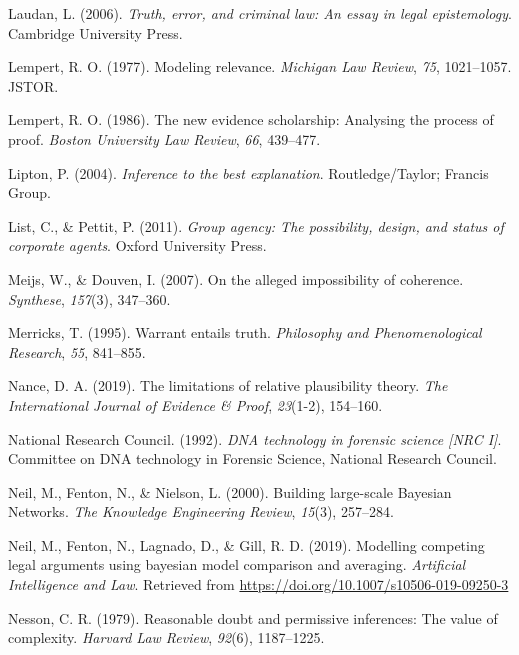\documentclass[11pt,dvipsnames,enabledeprecatedfontcommands]{scrartcl}
\begin{document}
\hypertarget{ref-laudan2006truth}{}
Laudan, L. (2006). \emph{Truth, error, and criminal law: An essay in
legal epistemology}. Cambridge University Press.

\hypertarget{ref-lempert1977modeling}{}
Lempert, R. O. (1977). Modeling relevance. \emph{Michigan Law Review},
\emph{75}, 1021--1057. JSTOR.

\hypertarget{ref-Lempert1986}{}
Lempert, R. O. (1986). The new evidence scholarship: Analysing the
process of proof. \emph{Boston University Law Review}, \emph{66},
439--477.

\hypertarget{ref-Lipton2004-LIPITT}{}
Lipton, P. (2004). \emph{Inference to the best explanation}.
Routledge/Taylor; Francis Group.

\hypertarget{ref-List2011Group}{}
List, C., \& Pettit, P. (2011). \emph{Group agency: The possibility,
design, and status of corporate agents}. Oxford University Press.

\hypertarget{ref-meijs2007}{}
Meijs, W., \& Douven, I. (2007). On the alleged impossibility of
coherence. \emph{Synthese}, \emph{157}(3), 347--360.

\hypertarget{ref-Merricks1995}{}
Merricks, T. (1995). Warrant entails truth. \emph{Philosophy and
Phenomenological Research}, \emph{55}, 841--855.

\hypertarget{ref-nance2019LimitationsRelativePlausibility}{}
Nance, D. A. (2019). The limitations of relative plausibility theory.
\emph{The International Journal of Evidence \& Proof}, \emph{23}(1-2),
154--160.

\hypertarget{ref-NRCI1992}{}
National Research Council. (1992). \emph{DNA technology in forensic
science \textup{{[}NRC I{]}}}. Committee on DNA technology in Forensic
Science, National Research Council.

\hypertarget{ref-neil2000BuildingLargescaleBayesian}{}
Neil, M., Fenton, N., \& Nielson, L. (2000). Building large-scale
Bayesian Networks. \emph{The Knowledge Engineering Review},
\emph{15}(3), 257--284.

\hypertarget{ref-Fenton2019Modelling}{}
Neil, M., Fenton, N., Lagnado, D., \& Gill, R. D. (2019). Modelling
competing legal arguments using bayesian model comparison and averaging.
\emph{Artificial Intelligence and Law}. Retrieved from
\url{https://doi.org/10.1007/s10506-019-09250-3}

\hypertarget{ref-Nesson1979Reasonable-doub}{}
Nesson, C. R. (1979). Reasonable doubt and permissive inferences: The
value of complexity. \emph{Harvard Law Review}, \emph{92}(6),
1187--1225.
\end{document}
